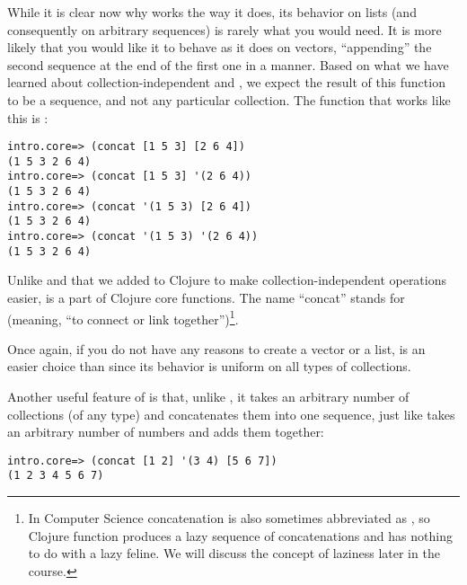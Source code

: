 While it is clear now why  works the way it does, its behavior on lists (and consequently on arbitrary sequences) is rarely what you would need. It is more likely that you would like it to behave as it does on vectors, ``appending'' the second sequence at the end of the first one in a  manner. Based on what we have learned about collection-independent  and , we expect the result of this function to be a sequence, and not any particular collection. The function that works like this is :
\begin{framed}
\begin{verbatim}
intro.core=> (concat [1 5 3] [2 6 4])
(1 5 3 2 6 4)
intro.core=> (concat [1 5 3] '(2 6 4))
(1 5 3 2 6 4)
intro.core=> (concat '(1 5 3) [2 6 4])
(1 5 3 2 6 4)
intro.core=> (concat '(1 5 3) '(2 6 4))
(1 5 3 2 6 4)
\end{verbatim}
\end{framed}
Unlike  and  that we added to Clojure to make collection-independent operations easier,  is a part of Clojure core functions. The name ``concat'' stands for  (meaning, ``to connect or link together'')\footnote{In Computer Science concatenation is also sometimes abbreviated as , so Clojure function  produces a lazy sequence of concatenations and has nothing to do with a lazy feline. We will discuss the concept of laziness later in the course.}.

Once again, if you do not have any reasons to create a vector or a list,  is an easier choice than  since its behavior is uniform on all types of collections. 

Another useful feature of  is that, unlike , it takes an arbitrary number of collections (of any type) and concatenates them into one sequence, just like \clocode{+} takes an arbitrary number of numbers and adds them together:
\begin{framed}
\begin{verbatim}
intro.core=> (concat [1 2] '(3 4) [5 6 7])
(1 2 3 4 5 6 7)
\end{verbatim}
\end{framed}

